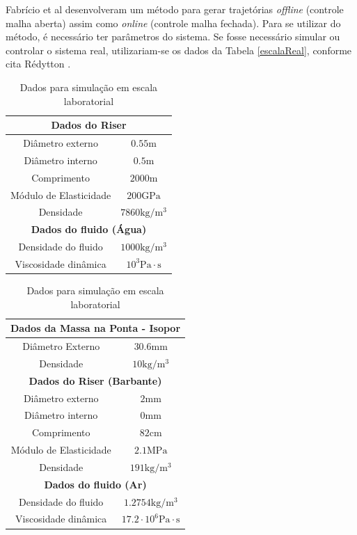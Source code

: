 Fabrício et al \cite{fabricioIFAC} desenvolveram um método para gerar trajetórias \textit{offline} (controle malha aberta) assim como \textit{online} (controle malha fechada). Para se utilizar do método, é necessário ter parâmetros do sistema. Se fosse necessário simular ou controlar o sistema real, utilizariam-se os dados da Tabela \ref{escalaReal}, conforme cita Rédytton \cite{redytton}.

\begin{table}[!ht]
\parbox{.45\linewidth}{
\centering
\caption{Dados para simulação em escala real\label{escalaReal} \cite{redytton}}
	\begin{tabular}{|c|c|}
	\hline
		\multicolumn{2}{|c|}{\textbf{Dados do Riser}}\\ \hline
		Diâmetro externo & $0.55\mathrm{m}$\\ \hline
		Diâmetro interno & $0.5\mathrm{m}$ \\ \hline
		Comprimento & $2000\mathrm{m}$ \\ \hline
		Módulo de Elasticidade & $200 \mathrm{GPa}$\\ \hline
		Densidade &  $7860\mathrm{kg}/\mathrm{m}^3$\\ \hline
		\multicolumn{2}{|c|}{\textbf{Dados do fluido (Água)}}\\ \hline
		Densidade do fluido &  $1000\mathrm{kg}/\mathrm{m}^3$\\ \hline
		Viscosidade dinâmica & $10^3 \mathrm{Pa}\cdot \mathrm{s}$ \\ \hline
	\end{tabular}
}
\hfill
\parbox{.45\linewidth}{
	\caption{Dados para simulação em escala laboratorial\label{escalaLaboratorial}}
	\centering
	\begin{tabular}{|c|c|}
		\hline
			\multicolumn{2}{|c|}{\textbf{Dados da Massa na Ponta - Isopor}} \\ \hline
			Diâmetro Externo & $30.6\mathrm{mm}$\\ \hline
			Densidade & $10\mathrm{kg}/\mathrm{m}^3$ \\ \hline
			\multicolumn{2}{|c|}{\textbf{Dados do Riser (Barbante)}}\\ \hline
			Diâmetro externo & $2\mathrm{mm}$\\ \hline
			Diâmetro interno & $0\mathrm{mm}$ \\ \hline
			Comprimento & $82\mathrm{cm}$ \\ \hline
			Módulo de Elasticidade & $2.1 \mathrm{MPa}$\\ \hline
			Densidade &  $191\mathrm{kg}/\mathrm{m}^3$\\ \hline
			\multicolumn{2}{|c|}{\textbf{Dados do fluido (Ar)}}\\ \hline
			Densidade do fluido &  $1.2754\mathrm{kg}/\mathrm{m}^3$\\ \hline
			Viscosidade dinâmica & $17.2\cdot 10^6 \mathrm{Pa}\cdot \mathrm{s}$ \\ \hline
		\end{tabular}
}

\end{table}


